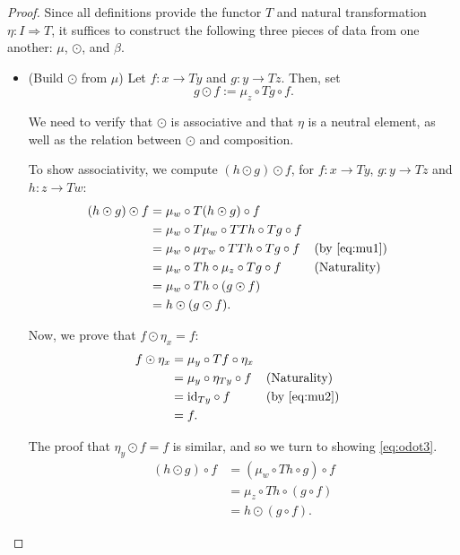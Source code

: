 \documentclass[11pt]{article}
\theoremstyle{nonumberplain}
\newtheorem{proof}{Proof}
\newcommand{\id}{\mathrm{id}}
\begin{document}
\begin{proof}
Since all definitions provide the functor $T$ and natural transformation $\eta \colon I \Rightarrow T$, it suffices to construct the following three pieces of data from one another: $\mu$, $\odot$, and $\beta$.

\begin{itemize}
\item (Build $\odot$ from $\mu$) Let $f \colon x \to T y$ and $g \colon y \to T z$. Then, set
\begin{equation}
g \odot f := \mu_z \circ Tg \circ f.
\end{equation}

We need to verify that $\odot$ is associative and that $\eta$ is a neutral element, as well as the relation between $\odot$ and composition.

To show associativity, we compute $(h \odot g) \odot f$, for $f \colon x \to Ty$, $g \colon y \to Tz$ and $h \colon z \to Tw$:
\begin{equation}
\begin{aligned}
(h \odot g) \odot f &= \mu_w \circ T(h \odot g) \circ f\\
&= \mu_w \circ T\mu_w \circ TTh \circ Tg \circ f\\
&= \mu_w \circ \mu_{Tw} \circ TTh \circ Tg \circ f &&\text{(by \eqref{eq:mu1})}\\
&= \mu_w \circ Th \circ \mu_{z} \circ Tg \circ f &&\text{(Naturality)} \\
&= \mu_w \circ Th \circ (g \odot f)\\
&= h \odot (g \odot f).
\end{aligned}
\end{equation}

Now, we prove that $f \odot \eta_x = f$:
\begin{equation}
\begin{aligned}
f \odot \eta_x &= \mu_y \circ Tf \circ \eta_x\\
&= \mu_y \circ \eta_{Ty} \circ f &&\text{(Naturality)} \\
&= \id_{T y} \circ f &&\text{(by \eqref{eq:mu2})}\\
&= f.
\end{aligned}
\end{equation}

The proof that $\eta_y \odot f = f$ is similar, and so we turn to showing \eqref{eq:odot3}.
\begin{equation}
\begin{aligned}
(h \odot g) \circ f &= (\mu_w \circ Th \circ g) \circ f\\
&= \mu_z \circ Th \circ (g \circ f)\\
&= h \odot (g \circ f).
\end{aligned}
\end{equation}


\end{itemize}
\end{proof}
\end{document}
